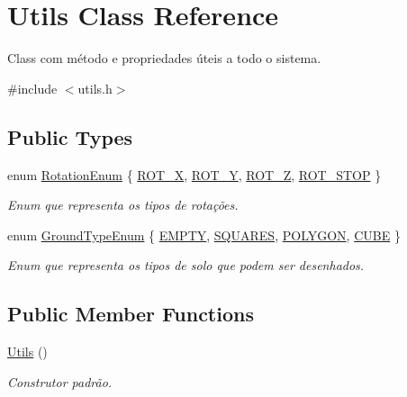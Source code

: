 \hypertarget{class_utils}{\section{Utils Class Reference}
\label{class_utils}
}


Class com método e propriedades úteis a todo o sistema.  




{\ttfamily \#include $<$utils.\+h$>$}

\subsection*{Public Types}
\begin{DoxyCompactItemize}
\item 
enum \hyperlink{class_utils_aa3de9729bf5409b0e8b1e5ab880a8199}{Rotation\+Enum} \{ \hyperlink{class_utils_aa3de9729bf5409b0e8b1e5ab880a8199a4bf372cd116c4baca790987002b5f2d9}{R\+O\+T\+\_\+\+X}, 
\hyperlink{class_utils_aa3de9729bf5409b0e8b1e5ab880a8199a81f1deb0707619e5ea8dad1e5118c4af}{R\+O\+T\+\_\+\+Y}, 
\hyperlink{class_utils_aa3de9729bf5409b0e8b1e5ab880a8199abbff5567d18045730a7a27286daad9e5}{R\+O\+T\+\_\+\+Z}, 
\hyperlink{class_utils_aa3de9729bf5409b0e8b1e5ab880a8199a0f2e743cb36bf159477386b1bc5b0957}{R\+O\+T\+\_\+\+S\+T\+O\+P}
 \}
\begin{DoxyCompactList}\small\item\em Enum que representa os tipos de rotações. \end{DoxyCompactList}\item 
enum \hyperlink{class_utils_af02e975129bf6ed7b10da91fbf5d2723}{Ground\+Type\+Enum} \{ \hyperlink{class_utils_af02e975129bf6ed7b10da91fbf5d2723a999218bf5deb05344ac6901789b97fda}{E\+M\+P\+T\+Y}, 
\hyperlink{class_utils_af02e975129bf6ed7b10da91fbf5d2723a70b4f81e6db81dbfacc37d2044215c9d}{S\+Q\+U\+A\+R\+E\+S}, 
\hyperlink{class_utils_af02e975129bf6ed7b10da91fbf5d2723a657ae525ff81fa1acc4669c9e3162bb6}{P\+O\+L\+Y\+G\+O\+N}, 
\hyperlink{class_utils_af02e975129bf6ed7b10da91fbf5d2723a2dd7e72f0202bac9b0a793d76f78a6f8}{C\+U\+B\+E}
 \}
\begin{DoxyCompactList}\small\item\em Enum que representa os tipos de solo que podem ser desenhados. \end{DoxyCompactList}\end{DoxyCompactItemize}
\subsection*{Public Member Functions}
\begin{DoxyCompactItemize}
\item 
\hypertarget{class_utils_a452e78692c87ed5c7c993b6c6ac4981a}{\hyperlink{class_utils_a452e78692c87ed5c7c993b6c6ac4981a}{Utils} ()}\label{class_utils_a452e78692c87ed5c7c993b6c6ac4981a}

\begin{DoxyCompactList}\small\item\em Construtor padrão. \end{DoxyCompactList}\end{DoxyCompactItemize}


